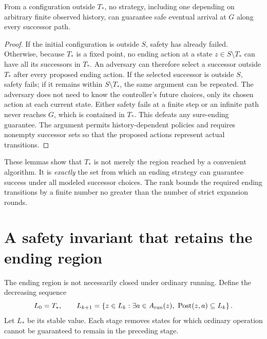 \begin{lemma}\label{r:ending-complete}
From a configuration outside $T_*$, no strategy, including one depending on arbitrary finite observed history, can guarantee safe eventual arrival at $G$ along every successor path.
\end{lemma}
\begin{proof}
If the initial configuration is outside $S$, safety has already failed. Otherwise, because $T_*$ is a fixed point, no ending action at a state $z\in S\setminus T_*$ can have all its successors in $T_*$. An adversary can therefore select a successor outside $T_*$ after every proposed ending action. If the selected successor is outside $S$, safety fails; if it remains within $S\setminus T_*$, the same argument can be repeated. The adversary does not need to know the controller's future choices, only its chosen action at each current state. Either safety fails at a finite step or an infinite path never reaches $G$, which is contained in $T_*$. This defeats any sure-ending guarantee. The argument permits history-dependent policies and requires nonempty successor sets so that the proposed actions represent actual transitions.
\end{proof}

These lemmas show that $T_*$ is not merely the region reached by a convenient algorithm. It is \emph{exactly} the set from which an ending strategy can guarantee success under all modeled successor choices. The rank bounds the required ending transitions by a finite number no greater than the number of strict expansion rounds.

\section{A safety invariant that retains the ending region}
The ending region is not necessarily closed under ordinary running. Define the decreasing sequence
\[
L_0=T_*,\qquad
L_{k+1}=\left\{z\in L_k:\exists a\in A_{\rm run}(z),\ \operatorname{Post}(z,a)\subseteq L_k\right\}.
\]
Let $L_*$ be its stable value. Each stage removes states for which ordinary operation cannot be guaranteed to remain in the preceding stage.

